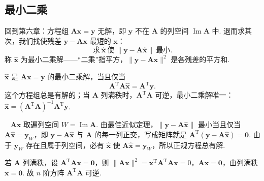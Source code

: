 \documentclass[lang=cn,10.5pt,scheme=chinese,toc=twocol,section,chinesefont=nofont,
twoside,citestyle=gb7714-2015,bibstyle=gb7714-2015]{elegantbook}
\DeclareRobustCommand{\textbf}[1]{{\lnsemiboldlatin\lnsemiboldcjk #1}}
\newcommand{\vv}[1]{\boldsymbol{#1}}
\newcommand{\zero}{\boldsymbol{0}}          %
\newcommand{\trans}{\mathrm{T}}             %
\numberwithin{equation}{section}   %
\newcommand{\imm}{\operatorname{Im}}        %
\newcommand*{\lnlabel}[1]{{\sffamily\bfseries\color{black}#1}}
\renewenvironment{proof}{%
	\par\noindent\lnlabel{\proofname}\;\ \color{black!90}\cfs}{\par}
\begin{document}
\subsection{最小二乘}

回到第六章：方程组 $\vv{Ax}=\vv y$ 无解，即 $\vv y$ 不在 $\vv A$ 的列空间 $\imm\vv A$ 中. 退而求其次，我们找使\textbf{残差} $\vv y-\vv{Ax}$ 最短的 $\vv x$：
\[\text{求}\ \hat{\vv x}\ \text{使}\ \|\vv y-\vv A\hat{\vv x}\|\ \text{最小}.\]
称 $\hat{\vv x}$ 为\textbf{最小二乘解}——“二乘”指平方，$\|\vv y-\vv{Ax}\|^2$ 是各残差的平方和.

\begin{theorem}[正规方程]\label{thm:normaleq}
  $\hat{\vv x}$ 是 $\vv{Ax}=\vv y$ 的最小二乘解，当且仅当
  \[\vv A^\trans\vv A\hat{\vv x}=\vv A^\trans\vv y.\]
  这个方程组总是有解的；当 $\vv A$ 列满秩时，$\vv A^\trans\vv A$ 可逆，最小二乘解唯一：$\hat{\vv x}=(\vv A^\trans\vv A)^{-1}\vv A^\trans\vv y$.
\end{theorem}
\begin{proof}
  $\vv A\vv x$ 取遍列空间 $W=\imm\vv A$. 由最佳近似定理，$\|\vv y-\vv A\hat{\vv x}\|$ 最小当且仅当 $\vv A\hat{\vv x}=\vv y_W$，即 $\vv y-\vv A\hat{\vv x}$ 与 $\vv A$ 的每一列正交，写成矩阵就是 $\vv A^\trans(\vv y-\vv A\hat{\vv x})=\zero$. 由于 $\vv y_W$ 存在且属于列空间，必有 $\hat{\vv x}$ 使 $\vv A\hat{\vv x}=\vv y_W$，所以正规方程总有解.

  若 $\vv A$ 列满秩，设 $\vv A^\trans\vv{Ax}=\zero$，则 $\|\vv{Ax}\|^2=\vv x^\trans\vv A^\trans\vv{Ax}=0$，$\vv{Ax}=\zero$，由列满秩 $\vv x=\zero$. 故 $n$ 阶方阵 $\vv A^\trans\vv A$ 可逆.
\end{proof}
\end{document}
